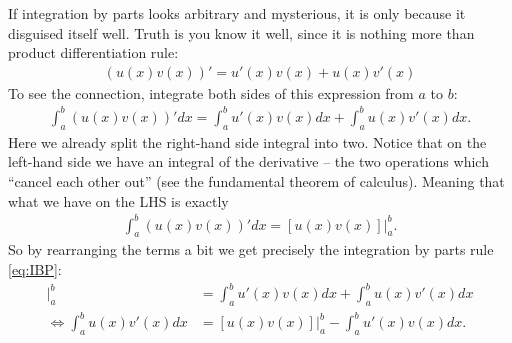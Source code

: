 \documentclass{article}
\begin{document}
If integration by parts looks arbitrary and mysterious, it is only because it disguised itself well. Truth is you know it well, since it is nothing more than product differentiation rule:
\begin{align*}
	\left( u(x)v(x) \right)' = u'(x) v(x) + u(x) v'(x)
\end{align*}
To see the connection, integrate both sides of this expression from $a$ to $b$:
\begin{align*}
	\int_a^b \left( u(x)v(x) \right)' dx = \int_a^b u'(x) v(x) dx + \int_a^b u(x) v'(x) dx.
\end{align*}
Here we already split the right-hand side integral into two. Notice that on the left-hand side we have an integral of the derivative -- the two operations which ``cancel each other out'' (see the fundamental theorem of calculus). Meaning that what we have on the LHS is exactly
\begin{align*}
	\int_a^b \left( u(x)v(x) \right)' dx = [u(x)v(x)]|_a^b.
\end{align*}
So by rearranging the terms a bit we get precisely the integration by parts rule \eqref{eq:IBP}:
\begin{align*}
	[u(x)v(x)]|_a^b &= \int_a^b u'(x) v(x) dx + \int_a^b u(x) v'(x) dx
	\\
	\Leftrightarrow \int_a^b u(x) v'(x) dx &= [u(x)v(x)]|_a^b - \int_a^b u'(x) v(x) dx.
\end{align*}




%
%
\end{document}
